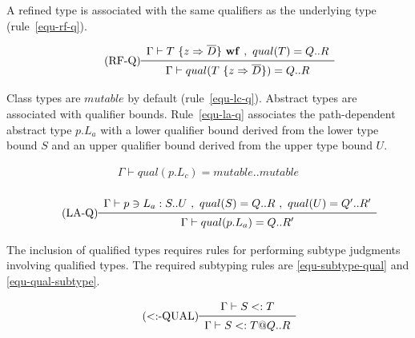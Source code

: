\vspace{0.4cm}

A refined type is associated with the same qualifiers as the underlying type (rule~\ref{equ-rf-q}).

\begin{equation*}\tag{RF-Q}\label{equ-rf-q}
\begin{array}{c}
\Gamma \vdash T\ \{ z \Rightarrow \overline{D} \}\ {\bf wf}\ ,\ qual(T)=Q..R \\
\midrule
\Gamma \vdash qual(T\ \{ z \Rightarrow \overline{D} \})=Q..R \\
\end{array}
\end{equation*}

\vspace{0.4cm}

Class types are $mutable$ by default (rule~\ref{equ-lc-q}).
Abstract types are associated with qualifier bounds.
Rule~\ref{equ-la-q} associates the path-dependent abstract type \mbox{$p.L_a$}
with a lower qualifier bound derived from the lower type bound $S$
and an upper qualifier bound derived from the upper type bound $U$.

\begin{equation*}\tag{LC-Q}\label{equ-lc-q}
\begin{array}{c}
\Gamma \vdash qual(p.L_c)=mutable..mutable \\
\end{array}
\end{equation*}

\vspace{0.4cm}

\begin{equation*}\tag{LA-Q}\label{equ-la-q}
\begin{array}{c}
\Gamma \vdash p \ni L_a : S..U\ ,\ qual(S)=Q..R\ ,\ qual(U)=Q'..R' \\
\midrule
\Gamma \vdash qual(p.L_a)=Q..R' \\
\end{array}
\end{equation*}

\vspace{0.4cm}

The inclusion of qualified types requires rules for performing subtype
judgments involving qualified types.
The required subtyping rules are \ref{equ-subtype-qual} and \ref{equ-qual-subtype}.

\begin{equation*}\tag{$<:$-QUAL}\label{equ-subtype-qual}
\begin{array}{c}
\Gamma \vdash S <: T \\
\midrule
\Gamma \vdash S <: T@Q..R \\
\end{array}
\end{equation*}

